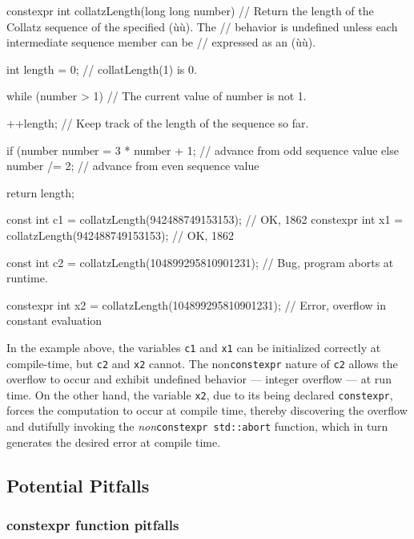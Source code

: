 \begin{emcppslisting}[emcppsstandards={c++14}]
constexpr int collatzLength(long long number)
    // Return the length of the Collatz sequence of the specified (ù{}ù). The
    // behavior is undefined unless each intermediate sequence member can be
    // expressed as an (ù{}ù).
{
    int length = 0;         // collatLength(1) is 0.

    while (number > 1)      // The current value of number is not 1.
    {
        ++length;           // Keep track of the length of the sequence so far.

        if (number %
        {
            number = 3 * number + 1;    // advance from odd sequence value
        }
        else
        {
            number /= 2;                // advance from even sequence value
        }
    }

    return length;
}

const     int c1 = collatzLength(942488749153153);  // OK, 1862
constexpr int x1 = collatzLength(942488749153153);  // OK, 1862

const int c2 = collatzLength(104899295810901231);
    // Bug, program aborts at runtime.

constexpr int x2 = collatzLength(104899295810901231);
    // Error, overflow in constant evaluation
\end{emcppslisting}
    
\noindent In the example above, the variables \lstinline!c1! and \lstinline!x1! can be
initialized correctly at compile-time, but \lstinline!c2! and \lstinline!x2!
cannot. The non\lstinline!constexpr! nature of \lstinline!c2! allows the
overflow to occur and exhibit undefined behavior --- integer overflow
--- at run time. On the other hand, the variable \lstinline!x2!, due to
its being declared \lstinline!constexpr!, forces the computation to
occur at compile time, thereby discovering the overflow and dutifully
invoking the \emph{non}\lstinline!constexpr!~\lstinline!std::abort! function,
which in turn generates the desired error at compile time.

\subsection[Potential Pitfalls]{Potential Pitfalls}\label{potential-pitfalls-constexprvar}

\subsubsection[\lstinline!constexpr! function pitfalls]{{\SubsubsecCode constexpr} function pitfalls}\label{constexpr-function-pitfalls}

